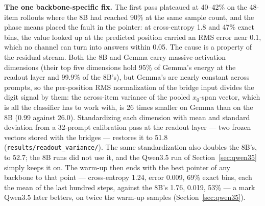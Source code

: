 \documentclass[11pt]{article}
\newcommand{\code}[1]{\texttt{#1}}
\begin{document}
\textbf{The one backbone-specific fix.} The first pass plateaued at 40--42\% on the 48-item rollouts where the 8B had reached 90\% at the same sample count, and the phase means placed the fault in the pointer: at cross-entropy 1.8 and 47\% exact bins, the value looked up at the predicted position carried an RMS error near 0.1, which no channel can turn into answers within 0.05. The cause is a property of the residual stream. Both the 8B and Gemma carry massive-activation dimensions (their top five dimensions hold 95\% of Gemma's energy at the readout layer and 99.9\% of the 8B's), but Gemma's are nearly constant across prompts, so the per-position RMS normalization of the bridge input divides the digit signal by them: the across-item variance of the pooled $x_0$-span vector, which is all the classifier has to work with, is 26 times smaller on Gemma than on the 8B (0.99 against 26.0). Standardizing each dimension with mean and standard deviation from a 32-prompt calibration pass at the readout layer --- two frozen vectors stored with the bridges --- restores it to 51.8 (\code{results/readout\_variance/}). The same standardization also doubles the 8B's, to 52.7; the 8B runs did not use it, and the Qwen3.5 run of Section~\ref{sec:qwen35} simply keeps it on. The warm-up then ends with the best pointer of any backbone to that point --- cross-entropy 1.24, error 0.009, 69\% exact bins, each the mean of the last hundred steps, against the 8B's 1.76, 0.019, 53\% --- a mark Qwen3.5 later betters, on twice the warm-up samples (Section~\ref{sec:qwen35}).
\end{document}
